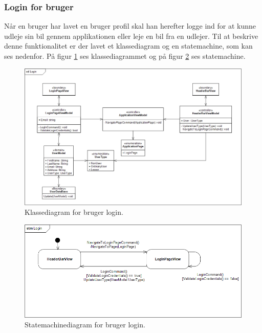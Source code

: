 \documentclass[Arkitektur/System_main.tex]{subfiles}
\begin{document}
\subsubsection{Login for bruger}
Når en bruger har lavet en bruger profil skal han herefter logge ind for at kunne udleje sin bil gennem applikationen eller leje en bil fra en udlejer. Til at beskrive denne funktionalitet er der lavet et klassediagram og en statemachine, som kan ses nedenfor. På figur \ref{fig:LoginCD} ses klassediagrammet og på figur \ref{fig:LoginSTM} ses statemachine.

\begin{figure}[H]
    \centering
    \includegraphics[width=\textwidth]{Arkitektur/Softwarearkitektur/User_Login/graphics/LoginCD.png}
    \caption{Klassediagram for bruger login. }
    \label{fig:LoginCD}
\end{figure}

\begin{figure}[H]
    \centering
    \includegraphics[width=\textwidth]{Arkitektur/Softwarearkitektur/User_Login/graphics/LoginSTM.png}
    \caption{Statemachinediagram for bruger login. }
    \label{fig:LoginSTM}
\end{figure}
\end{document}
